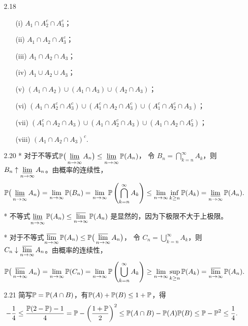 \begin{itemize}
    \item[2.18]
    \begin{itemize}
        \item[(i)] $A_1\cap A_2^c\cap A_3^c$；
        \item[(ii)] $A_1\cap A_2\cap A_3^c$；
        \item[(iii)] $A_1\cap A_2\cap A_3$；
        \item[(iv)] $A_1\cup A_2\cup A_3$；
        \item[(v)] $(A_1\cap A_2)\cup(A_1\cap A_3)\cup(A_2\cap A_3)$；
        \item[(vi)] $(A_1\cap A_2^c\cap A_3^c)\cup
        (A_1^c\cap A_2\cap A_3^c)\cup(A_1^c\cap A_2^c\cap A_3)$；
        \item[(vii)] $(A_1^c\cap A_2\cap A_3)\cup
        (A_1\cap A_2^c\cap A_3)\cup(A_1\cap A_2\cap A_3^c)$；
        \item[(viii)] $(A_1\cap A_2\cap A_3)^c$.
    \end{itemize}
    
    \item[2.20]
    * 对于不等式$\mathbb{P}\big(\varliminf\limits_{n\to\infty}A_n\big) \leq \varliminf\limits_{n\to\infty}\mathbb{P}(A_n)$，
    令 $B_n = \bigcap\limits_{k=n}^\infty A_k$，则 $B_n \uparrow \varliminf\limits_{n\to\infty} A_n$。由概率的连续性，
    $$\mathbb{P}\big(\varliminf_{n\to\infty} A_n\big) = \lim_{n\to\infty} \mathbb{P}(B_n) 
    = \lim_{n\to\infty} \mathbb{P}\left(\bigcap_{k=n}^\infty A_k\right)
    \leq \lim_{n\to\infty} \inf_{k\geq n} \mathbb{P}(A_k) = \varliminf_{n\to\infty} \mathbb{P}(A_n).$$

    * 不等式$\varliminf\limits_{n\to\infty}\mathbb{P}(A_n) \leq \varlimsup\limits_{n\to\infty}\mathbb{P}(A_n)$
    是显然的，因为下极限不大于上极限。

    * 对于不等式$\varlimsup\limits_{n\to\infty}\mathbb{P}(A_n) \leq \mathbb{P}\big(\varlimsup\limits_{n\to\infty}A_n\big)$，
    令 $C_n = \bigcup\limits_{k=n}^\infty A_k$，则 $C_n \downarrow \varlimsup\limits_{n\to\infty} A_n$。由概率的连续性，
    $$\mathbb{P}\big(\varlimsup_{n\to\infty} A_n\big) = \lim_{n\to\infty} \mathbb{P}(C_n) 
    = \lim_{n\to\infty} \mathbb{P}\left(\bigcup_{k=n}^\infty A_k\right) 
    \geq \lim_{n\to\infty} \sup_{k\geq n} \mathbb{P}(A_k) = \varlimsup_{n\to\infty} \mathbb{P}(A_n).$$

    \item[2.21]
    简写$\mathbb{P}=\mathbb{P}(A\cap B)$，有$\mathbb{P}(A)+\mathbb{P}(B)\le1+\mathbb{P}$，得
    $$-\frac{1}{4}\le\frac{\mathbb{P}(2-\mathbb{P})-1}{4}=\mathbb{P}-\left(\frac{1+\mathbb{P}}{2}\right)^2
    \le\mathbb{P}(A\cap B)-\mathbb{P}(A)\mathbb{P}(B)\le\mathbb{P}-\mathbb{P}^2\le\frac{1}{4}.$$
    

\end{itemize}
